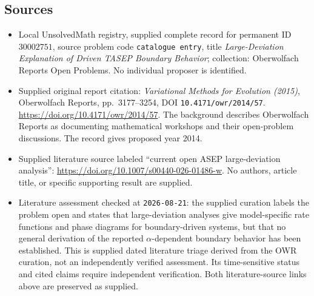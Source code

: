 \documentclass[11pt]{article}
\begin{document}
\subsection{Sources}
\begin{itemize}
\item Local UnsolvedMath registry, supplied complete record for permanent ID \(30002751\), source problem code \texttt{catalogue entry}, title \emph{Large-Deviation Explanation of Driven TASEP Boundary Behavior}; collection: Oberwolfach Reports Open Problems. No individual proposer is identified.
\item Supplied original report citation: \emph{Variational Methods for Evolution (2015)}, Oberwolfach Reports, pp.~3177--3254, DOI \texttt{10.4171/owr/2014/57}. \url{https://doi.org/10.4171/owr/2014/57}. The background describes Oberwolfach Reports as documenting mathematical workshops and their open-problem discussions. The record gives proposed year 2014.
\item Supplied literature source labeled ``current open ASEP large-deviation analysis'': \url{https://doi.org/10.1007/s00440-026-01486-w}. No authors, article title, or specific supporting result are supplied.
\item Literature assessment checked at \texttt{2026-08-21}: the supplied curation labels the problem open and states that large-deviation analyses give model-specific rate functions and phase diagrams for boundary-driven systems, but that no general derivation of the reported \(\alpha\)-dependent boundary behavior has been established. This is supplied dated literature triage derived from the OWR curation, not an independently verified assessment. Its time-sensitive status and cited claims require independent verification. Both literature-source links above are preserved as supplied.
\end{itemize}
\end{document}
